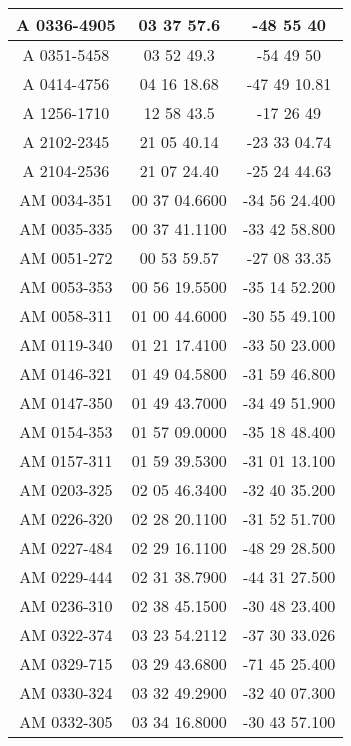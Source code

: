 \begin{apendicesenv}
\begin{longtable}{|c|c|c|}
            A 0336-4905 & 03 37 57.6 & -48 55 40 \\ \hline
            A 0351-5458 & 03 52 49.3 & -54 49 50 \\ \hline
            A 0414-4756 & 04 16 18.68 & -47 49 10.81 \\ \hline
            A 1256-1710 & 12 58 43.5 & -17 26 49 \\ \hline
            A 2102-2345 & 21 05 40.14 & -23 33 04.74 \\ \hline
            A 2104-2536 & 21 07 24.40 & -25 24 44.63 \\ \hline
            AM 0034-351 & 00 37 04.6600 & -34 56 24.400 \\ \hline
            AM 0035-335 & 00 37 41.1100 & -33 42 58.800 \\ \hline
            AM 0051-272 & 00 53 59.57 & -27 08 33.35 \\ \hline
            AM 0053-353 & 00 56 19.5500 & -35 14 52.200 \\ \hline
            AM 0058-311 & 01 00 44.6000 & -30 55 49.100 \\ \hline
            AM 0119-340 & 01 21 17.4100 & -33 50 23.000 \\ \hline
            AM 0146-321 & 01 49 04.5800 & -31 59 46.800 \\ \hline
            AM 0147-350 & 01 49 43.7000 & -34 49 51.900 \\ \hline
            AM 0154-353 & 01 57 09.0000 & -35 18 48.400 \\ \hline
            AM 0157-311 & 01 59 39.5300 & -31 01 13.100 \\ \hline
            AM 0203-325 & 02 05 46.3400 & -32 40 35.200 \\ \hline
            AM 0226-320 & 02 28 20.1100 & -31 52 51.700 \\ \hline
            AM 0227-484 & 02 29 16.1100 & -48 29 28.500 \\ \hline
            AM 0229-444 & 02 31 38.7900 & -44 31 27.500 \\ \hline
            AM 0236-310 & 02 38 45.1500 & -30 48 23.400 \\ \hline
            AM 0322-374 & 03 23 54.2112 & -37 30 33.026 \\ \hline
            AM 0329-715 & 03 29 43.6800 & -71 45 25.400 \\ \hline
            AM 0330-324 & 03 32 49.2900 & -32 40 07.300 \\ \hline
            AM 0332-305 & 03 34 16.8000 & -30 43 57.100 \\ \hline

\end{longtable}
\end{apendicesenv}
